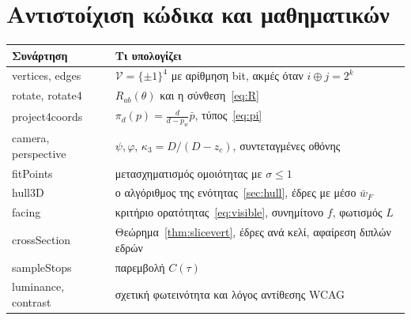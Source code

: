 \documentclass[10pt,a4paper]{article}
\theoremstyle{plain}
\theoremstyle{definition}
\newcommand{\V}{\mathcal{V}}
\newcommand{\eng}[1]{\textenglish{#1}}
\begin{document}
\section{Αντιστοίχιση κώδικα και μαθηματικών}
\begin{center}
\small
\begin{tabularx}{\linewidth}{@{}>{\ttfamily}p{3.4cm}X@{}}
\toprule
\textrm{\textbf{Συνάρτηση}} & \textbf{Τι υπολογίζει}\\
\midrule
vertices, edges & $\V=\{\pm1\}^4$ με αρίθμηση bit, ακμές όταν $i\oplus j=2^k$\\
rotate, rotate4 & $R_{ab}(\theta)$ και η σύνθεση~\eqref{eq:R}\\
project4coords & $\pi_d(p)=\frac{d}{d-p_w}\bar p$, τύπος~\eqref{eq:pi}\\
camera, perspective & $\psi,\varphi$, $\kappa_3=D/(D-z_c)$, συντεταγμένες οθόνης\\
fitPoints & μετασχηματισμός ομοιότητας με $\sigma\le1$\\
hull3D & ο αλγόριθμος της ενότητας~\ref{sec:hull}, έδρες με μέσο $\bar w_F$\\
facing & κριτήριο ορατότητας~\eqref{eq:visible}, συνημίτονο $f$, φωτισμός $L$\\
crossSection & Θεώρημα~\ref{thm:slicevert}, έδρες ανά κελί, αφαίρεση διπλών εδρών\\
sampleStops & παρεμβολή $C(\tau)$\\
luminance, contrast & σχετική φωτεινότητα και λόγος αντίθεσης \eng{WCAG}\\
\bottomrule
\end{tabularx}
\end{center}
\end{document}
